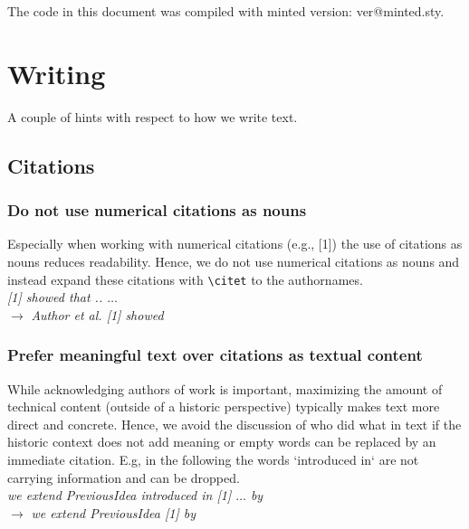 \documentclass[review, anonymous, acmsmall, screen]{acmart}
\newenvironment{draftonly}{}{}
\begin{document}
\begin{draftonly}

The code in this document was compiled with minted version: \csname ver@minted.sty\endcsname.

\section{Writing}

A couple of hints with respect to how we write text.

\subsection{Citations}
\label{appendix:citations}

\subsubsection{Do not use numerical citations as nouns}
Especially when working with numerical citations (e.g., [1]) the use of
citations as nouns reduces readability. Hence, we do not use numerical citations
as nouns and instead expand these citations with \texttt{\textbackslash{}citet} to the
authornames.
\\
{\color{pairedTwoDarkBlue}
\textit{[1] showed that .. $\dots$}}\\
$\to$ {\color{pairedFourDarkGreen}\textit{Author et al. [1] showed}}

\subsubsection{Prefer meaningful text over citations as textual content}
While acknowledging authors of work is important, maximizing the amount of technical
content (outside of a historic perspective) typically makes text more direct and
concrete. Hence, we avoid the discussion of who did what in text if the
historic context does not add meaning or empty words can be replaced by an immediate
citation. E.g, in the following the words `introduced in` are not carrying
information and can be dropped.\\
{\color{pairedTwoDarkBlue}
\textit{we extend PreviousIdea introduced in [1] $\dots$ by}}\\
$\to$ {\color{pairedFourDarkGreen}\textit{we extend PreviousIdea [1] by}}



\end{draftonly}
\end{document}
